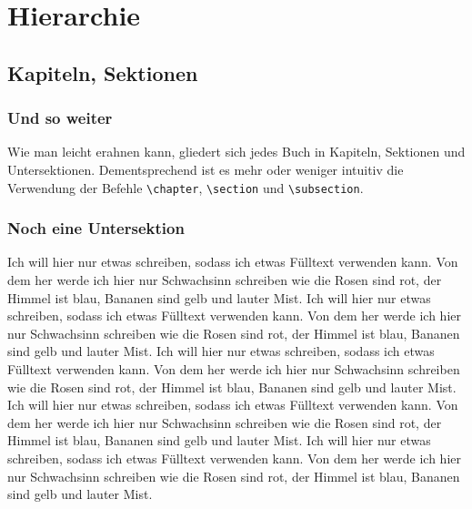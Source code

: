 
\chapter*{Hierarchie}


\section*{Kapiteln, Sektionen}


\subsection*{Und so weiter}

Wie man leicht erahnen kann, gliedert sich jedes Buch in Kapiteln, Sektionen und Untersektionen. Dementsprechend ist es mehr oder weniger intuitiv die Verwendung der Befehle \verb=\chapter=, \verb=\section= und \verb=\subsection=.


\subsection*{Noch eine Untersektion}

Ich will hier nur etwas schreiben, sodass ich etwas Fülltext verwenden kann. Von dem her werde ich hier nur Schwachsinn schreiben wie die Rosen sind rot, der Himmel ist blau, Bananen sind gelb und lauter Mist. Ich will hier nur etwas schreiben, sodass ich etwas Fülltext verwenden kann. Von dem her werde ich hier nur Schwachsinn schreiben wie die Rosen sind rot, der Himmel ist blau, Bananen sind gelb und lauter Mist. Ich will hier nur etwas schreiben, sodass ich etwas Fülltext verwenden kann. Von dem her werde ich hier nur Schwachsinn schreiben wie die Rosen sind rot, der Himmel ist blau, Bananen sind gelb und lauter Mist. Ich will hier nur etwas schreiben, sodass ich etwas Fülltext verwenden kann. Von dem her werde ich hier nur Schwachsinn schreiben wie die Rosen sind rot, der Himmel ist blau, Bananen sind gelb und lauter Mist. Ich will hier nur etwas schreiben, sodass ich etwas Fülltext verwenden kann. Von dem her werde ich hier nur Schwachsinn schreiben wie die Rosen sind rot, der Himmel ist blau, Bananen sind gelb und lauter Mist. 

